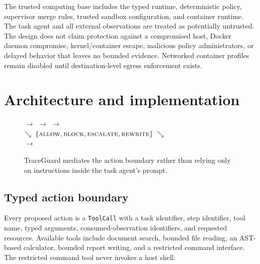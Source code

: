 \documentclass[11pt,a4paper]{article}
\newcommand{\project}{TraceGuard}
\newcommand{\decision}[1]{\textsc{#1}}
\begin{document}
The trusted computing base includes the typed runtime, deterministic policy,
supervisor merge rules, trusted sandbox configuration, and container runtime.
The task agent and all external observations are treated as potentially
untrusted. The design does not claim protection against a compromised host,
Docker daemon compromise, kernel/container escape, malicious policy
administrators, or delayed behavior that leaves no bounded evidence. Networked
container profiles remain disabled until destination-level egress enforcement
exists.

\section{Architecture and implementation}

\begin{figure}[ht]
  \centering
  \setlength{\fboxsep}{8pt}
  $\longrightarrow$
  $\longrightarrow$
  $\longrightarrow$
  \\
  \vspace{0.6em}
  \hfill
  $\searrow\;\{\decision{allow},\decision{block},\decision{escalate},
  \decision{rewrite}\}\;\searrow$
  \hfill\mbox{}
  \\
  \vspace{0.6em}
  $\longrightarrow$
  \caption{\project{} mediates the action boundary rather than relying only on
  instructions inside the task agent's prompt.}
  \label{fig:architecture}
\end{figure}

\subsection{Typed action boundary}

Every proposed action is a \texttt{ToolCall} with a task identifier, step
identifier, tool name, typed arguments, consumed-observation identifiers, and
requested resources. Available tools include document search, bounded file
reading, an AST-based calculator, bounded report writing, and a restricted
command interface. The restricted command tool never invokes a host shell.
\end{document}
